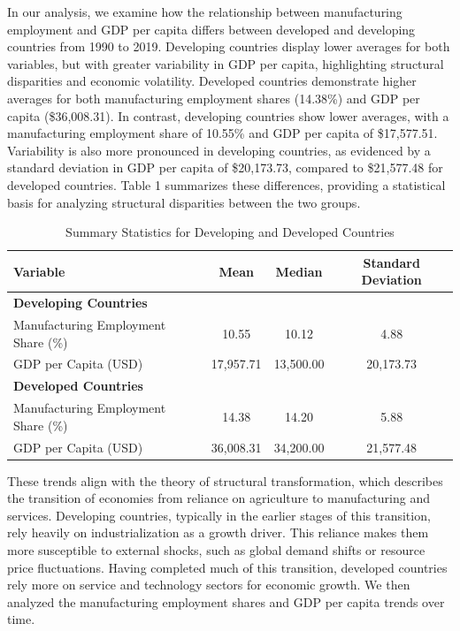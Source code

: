\documentclass[12pt]{article}
\begin{document}
    In our analysis, we examine how the relationship between manufacturing employment and GDP per capita differs between developed and developing countries from 1990 to 2019. Developing countries display lower averages for both variables, but with greater variability in GDP per capita, highlighting structural disparities and economic volatility.
    Developed countries demonstrate higher averages for both manufacturing employment shares (14.38\%) and GDP per capita (\$36,008.31). In contrast, developing countries show lower averages, with a manufacturing employment share of 10.55\% and GDP per capita of \$17,577.51. Variability is also more pronounced in developing countries, as evidenced by a standard deviation in GDP per capita of \$20,173.73, compared to \$21,577.48 for developed countries. Table 1 summarizes these differences, providing a statistical basis for analyzing structural disparities between the two groups.
\begin{table}[ht]
\centering
\caption{Summary Statistics for Developing and Developed Countries}
\begin{tabular}{|l|c|c|c|}
\hline
\textbf{Variable} & \textbf{Mean} & \textbf{Median} & \textbf{Standard Deviation} \\ \hline
\multicolumn{4}{|l|}{\textbf{Developing Countries}} \\ \hline
Manufacturing Employment Share (\%) & 10.55 & 10.12 & 4.88 \\ \hline
GDP per Capita (USD) & 17,957.71 & 13,500.00 & 20,173.73 \\ \hline
\multicolumn{4}{|l|}{\textbf{Developed Countries}} \\ \hline
Manufacturing Employment Share (\%) & 14.38 & 14.20 & 5.88 \\ \hline
GDP per Capita (USD) & 36,008.31 & 34,200.00 & 21,577.48 \\ \hline
\end{tabular}
\label{table 1}
\end{table}


    These trends align with the theory of structural transformation, which describes the transition of economies from reliance on agriculture to manufacturing and services. Developing countries, typically in the earlier stages of this transition, rely heavily on industrialization as a growth driver. This reliance makes them more susceptible to external shocks, such as global demand shifts or resource price fluctuations. Having completed much of this transition, developed countries rely more on service and technology sectors for economic growth.
    We then analyzed the manufacturing employment shares and GDP per capita trends over time.
\end{document}
